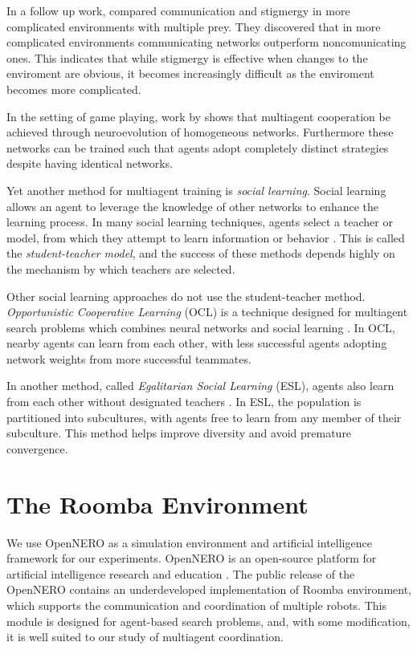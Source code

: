 \documentclass[conference]{IEEEtran}
\begin{document}
In a follow up work, \cite{rajagopalan2011role} compared communication and stigmergy in more complicated environments with multiple prey. They discovered that in more complicated environments communicating networks outperform noncomunicating ones. This indicates that while stigmergy is effective when changes to the enviroment are obvious, it becomes increasingly difficult as the enviroment becomes more complicated.

In the setting of game playing, work by \cite{bryant2003neuroevolution} shows that multiagent cooperation be achieved through neuroevolution of homogeneous networks. Furthermore these networks can be trained such that agents adopt completely distinct strategies despite having identical networks.

Yet another method for multiagent training is \textit{social learning}. Social learning allows an agent to leverage the knowledge of other networks to enhance the learning process.
In many social learning techniques, agents select a teacher or model, from which they attempt to learn information or behavior \cite{acerbi2006cultural}. This is called the \textit{student-teacher model}, and the success of these methods depends highly on the mechanism by which teachers are selected.

Other social learning approaches do not use the student-teacher method. \textit{Opportunistic Cooperative Learning} (OCL) is a technique designed for multiagent search problems which combines neural networks and social learning \cite{yang2002ocl}. In OCL, nearby agents can learn from each other, with less successful agents adopting network weights from more successful teammates. 

In another method, called \textit{Egalitarian Social Learning} (ESL), agents also learn from each other without designated teachers \cite{miikkulainen2012multiagent}. In ESL, the population is partitioned into subcultures, with agents free to learn from any member of their subculture. This method helps improve diversity and avoid premature convergence. 


\section{The Roomba Environment} \label{section:environment}
We use OpenNERO as a simulation environment and artificial intelligence framework for our experiments. 
OpenNERO is an open-source platform for artificial intelligence
research and education \cite{karpov2008opennero}. 
The public release of the OpenNERO contains an underdeveloped implementation
of Roomba environment, which supports the communication and coordination of
multiple robots. This module is designed for agent-based search problems, and, with some modification, it is well suited to our study of multiagent coordination.
\end{document}
